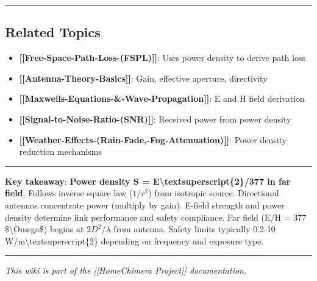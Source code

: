 \begin{center}\rule{0.5\linewidth}{0.5pt}\end{center}

\subsection{Related Topics}\label{related-topics}

\begin{itemize}
\tightlist
\item
  \textbf{{[}{[}Free-Space-Path-Loss-(FSPL){]}{]}}: Uses power density
  to derive path loss
\item
  \textbf{{[}{[}Antenna-Theory-Basics{]}{]}}: Gain, effective aperture,
  directivity
\item
  \textbf{{[}{[}Maxwell\textquotesingle s-Equations-\&-Wave-Propagation{]}{]}}:
  E and H field derivation
\item
  \textbf{{[}{[}Signal-to-Noise-Ratio-(SNR){]}{]}}: Received power from
  power density
\item
  \textbf{{[}{[}Weather-Effects-(Rain-Fade,-Fog-Attenuation){]}{]}}:
  Power density reduction mechanisms
\end{itemize}

\begin{center}\rule{0.5\linewidth}{0.5pt}\end{center}

\textbf{Key takeaway}: \textbf{Power density S =
E\textbackslash textsuperscript\{2\}/377 in far field}. Follows inverse
square law (\(1/r^2\)) from isotropic source. Directional antennas
concentrate power (multiply by gain). E-field strength and power density
determine link performance and safety compliance. Far field (E/H = 377
\$\textbackslash Omega\$) begins at \(2D^2/\lambda\) from antenna.
Safety limits typically 0.2-10 W/m\textbackslash textsuperscript\{2\}
depending on frequency and exposure type.

\begin{center}\rule{0.5\linewidth}{0.5pt}\end{center}

\emph{This wiki is part of the {[}{[}Home\textbar Chimera Project{]}{]}
documentation.}
